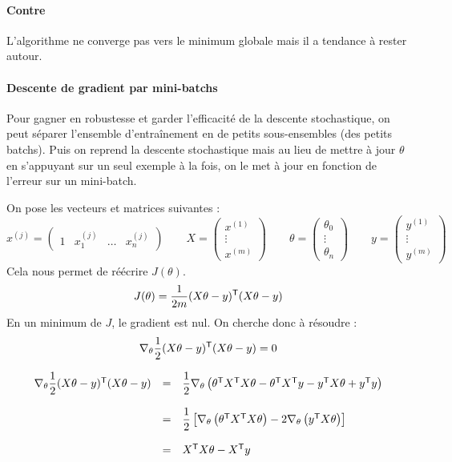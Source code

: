 \paragraph{Contre}
L'algorithme ne converge pas vers le minimum globale mais il a tendance à rester autour.

\paragraph{Descente de gradient par mini-batchs}
Pour gagner en robustesse et garder l'efficacité de la descente stochastique, on peut séparer l'ensemble d'entraînement en de petits sous-ensembles (des petits batchs). Puis on reprend la descente stochastique mais au lieu de mettre à jour $\theta$ en s'appuyant sur un seul exemple à la fois, on le met à jour en fonction de l'erreur sur un mini-batch.


On pose les vecteurs et matrices suivantes :
$$ x^{(j)} = \begin{pmatrix} 1 & x_1^{(j)} & \dots & x_n^{(j)} \end{pmatrix} \qquad
X = \begin{pmatrix} x^{(1)} \\ \vdots \\ x^{(m)} \end{pmatrix} \qquad 
\theta = \begin{pmatrix} \theta_0 \\ \vdots \\ \theta_n \end{pmatrix} \qquad
y = \begin{pmatrix} y^{(1)} \\ \vdots \\ y^{(m)} \end{pmatrix} $$
Cela nous permet de réécrire $J(\theta)$.
$$ J(\theta) = \dfrac{1}{2m} (X\theta - y)^{\mathsf{T}} (X\theta - y) $$
En un minimum de $J$, le gradient est nul. On cherche donc à résoudre :
$$ \nabla_\theta \dfrac{1}{2} (X\theta - y)^{\mathsf{T}} (X\theta - y) = 0 $$
\newpage

$$ \begin{array}{lll}
\nabla_\theta \dfrac{1}{2} (X\theta - y)^{\mathsf{T}} (X\theta - y)
& = & \dfrac{1}{2} \nabla_\theta \left( \theta^{\mathsf{T}} X^{\mathsf{T}} X \theta - \theta^{\mathsf{T}} X^{\mathsf{T}} y - y^{\mathsf{T}} X \theta + y^{\mathsf{T}} y \right) \\ \\
& = & \dfrac{1}{2} \left[ \nabla_\theta \left(\theta^{\mathsf{T}} X^{\mathsf{T}} X \theta \right) - 2 \nabla_\theta \left( y^{\mathsf{T}} X \theta \right) \right] \\ \\
& = & X^{\mathsf{T}} X \theta - X^{\mathsf{T}} y
\end{array} $$


